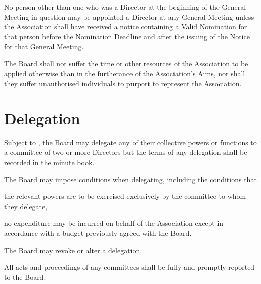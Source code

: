 \documentclass[10pt]{mk-articles-of-association}
\newcommand{\EC}[0]{Board}
\newcommand{\Exec}[0]{\EC{} }
\begin{document}
\begin{constenum}
  \item No person other than one who was a Director at the beginning
    of the General Meeting in question may be
    appointed a Director at any General Meeting unless the Association
    shall have received a notice containing a Valid Nomination for that
    person before the Nomination Deadline and after the issuing of the
    Notice for that General Meeting.

  \item The \Exec shall not suffer the time or other resources of
    the Association to be applied otherwise than in the furtherance of
    the Association's Aims, nor shall they suffer unauthorised individuals
    to purport to represent the Association.

\end{constenum}



\section{Delegation}

\begin{constenum}

\item Subject to , the \Exec may delegate
  any of their collective powers or functions to a committee of two or
  more Directors but the terms of any delegation shall be
  recorded in the minute book.

\item The \Exec may impose conditions when delegating, including
  the conditions that

\begin{constenum}

\item the relevant powers are to be exercised exclusively by the
  committee to whom they delegate,

\item no expenditure may be incurred on behalf of the Association except
  in accordance with a budget previously agreed with the \EC.

\end{constenum}

\item The \Exec may revoke or alter a delegation.

\item All acts and proceedings of any committees shall be fully and
  promptly reported to the \EC.

\end{constenum}
\end{document}
